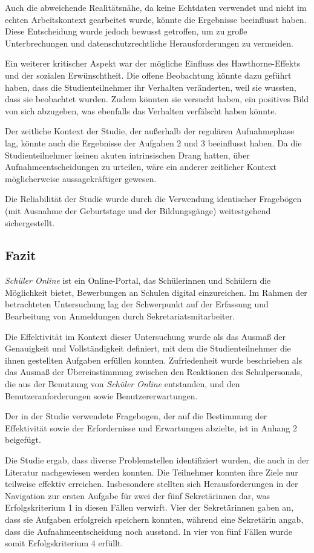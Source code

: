 Auch die abweichende Realitätsnähe, da keine Echtdaten verwendet und nicht im echten Arbeitskontext gearbeitet wurde, könnte die Ergebnisse beeinflusst haben. Diese Entscheidung wurde jedoch bewusst getroffen, um zu große Unterbrechungen und datenschutzrechtliche Herausforderungen zu vermeiden.

Ein weiterer kritischer Aspekt war der mögliche Einfluss des Hawthorne-Effekts und der sozialen Erwünschtheit. Die offene Beobachtung könnte dazu geführt haben, dass die Studienteilnehmer ihr Verhalten veränderten, weil sie wussten, dass sie beobachtet wurden. Zudem könnten sie versucht haben, ein positives Bild von sich abzugeben, was ebenfalls das Verhalten verfälscht haben könnte.

Der zeitliche Kontext der Studie, der außerhalb der regulären Aufnahmephase lag, könnte auch die Ergebnisse der Aufgaben 2 und 3 beeinflusst haben. Da die Studienteilnehmer keinen akuten intrinsischen Drang hatten, über Aufnahmeentscheidungen zu urteilen, wäre ein anderer zeitlicher Kontext möglicherweise aussagekräftiger gewesen.

Die Reliabilität der Studie wurde durch die Verwendung identischer Fragebögen (mit Ausnahme der Geburtstage und der Bildungsgänge) weitestgehend sichergestellt.

\subsection{Fazit}

\textit{Schüler Online} ist ein Online-Portal, das Schülerinnen und Schülern die Möglichkeit bietet, Bewerbungen an Schulen digital einzureichen. Im Rahmen der betrachteten Untersuchung lag der Schwerpunkt auf der Erfassung und Bearbeitung von Anmeldungen durch Sekretariatsmitarbeiter.

Die Effektivität im Kontext dieser Untersuchung wurde als das Ausmaß der Genauigkeit und Vollständigkeit definiert, mit dem die Studienteilnehmer die ihnen gestellten Aufgaben erfüllen konnten. Zufriedenheit wurde beschrieben als das Ausmaß der Übereinstimmung zwischen den Reaktionen des Schulpersonals, die aus der Benutzung von \textit{Schüler Online} entstanden, und den Benutzeranforderungen sowie Benutzererwartungen.

Der in der Studie verwendete Fragebogen, der auf die Bestimmung der Effektivität sowie der Erfordernisse und Erwartungen abzielte, ist in Anhang 2 beigefügt.

Die Studie ergab, dass diverse Problemstellen identifiziert wurden, die auch in der Literatur nachgewiesen werden konnten. Die Teilnehmer konnten ihre Ziele nur teilweise effektiv erreichen. Insbesondere stellten sich Herausforderungen in der Navigation zur ersten Aufgabe für zwei der fünf Sekretärinnen dar, was Erfolgskriterium 1 in diesen Fällen verwirft. Vier der Sekretärinnen gaben an, dass sie Aufgaben erfolgreich speichern konnten, während eine Sekretärin angab, dass die Aufnahmeentscheidung noch ausstand. In vier von fünf Fällen wurde somit Erfolgskriterium 4 erfüllt.

